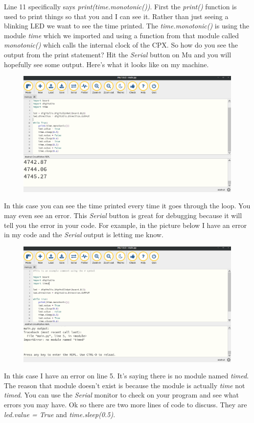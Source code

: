 Line 11 specifically says {\it print(time.monotonic())}. First the
{\it print()} function is used to print things so that you and I can
see it. Rather than just seeing a blinking LED we want to see the time
printed. The {\it time.monotonic()} is using the module {\it time} which we
imported and using a function from that module called {\it monotonic()}
which calls the internal clock of the CPX. So how do you see the
output from the print statement? Hit the {\it Serial} button on Mu and you
will hopefully see some output. Here’s what it looks like on my
machine. 
\begin{figure}[H]
  \begin{center}
    \includegraphics[width=\textwidth]{Figures/blinkmu2.png}
  \end{center}
\end{figure}
In this case you can see the time printed every time it goes through
the loop. You may even see an error. This {\it Serial} button is great for
debugging because it will tell you the error in your code. For
example, in the picture below I have an error in my code and the
{\it Serial} output is letting me know.
\begin{figure}[H]
  \begin{center}
    \includegraphics[width=\textwidth]{Figures/blinkerror.png}
  \end{center}
\end{figure}
In this case I have an error on line 5. It’s saying there is no module
named {\it timed}. The reason that module doesn’t exist is because the
module is actually {\it time} not {\it timed}. You can use the {\it
  Serial} monitor to check on your program and see what errors you may
have. Ok so there are two more lines of code to discuss. They are
{\it led.value = True} and {\it time.sleep(0.5)}.

